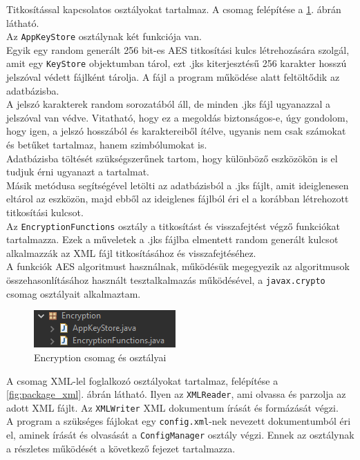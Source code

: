 Titkosítással kapcsolatos osztályokat tartalmaz. A csomag felépítése a \ref{fig:package_encryption}. ábrán látható.
\vspace{5pt}\\Az \texttt{AppKeyStore} osztálynak két funkciója van. 
\\Egyik egy random generált 256 bit-es AES titkosítási kulcs létrehozására szolgál, amit egy \texttt{KeyStore} objektumban tárol, ezt .jks kiterjesztésű 256 karakter hosszú jelszóval védett fájlként tárolja. A fájl a program működése alatt feltöltődik az adatbázisba.
\\A jelszó karakterek random sorozatából áll, de minden .jks fájl ugyanazzal a jelszóval van védve. Vitatható, hogy ez a megoldás biztonságos-e, úgy gondolom, hogy igen, a jelszó hosszából és karaktereiből ítélve, ugyanis nem csak számokat és betűket tartalmaz, hanem szimbólumokat is.
\\Adatbázisba töltését szükségszerűnek tartom, hogy különböző eszközökön is el tudjuk érni ugyanazt a tartalmat.
\\Másik metódusa segítségével letölti az adatbázisból a .jks fájlt, amit ideiglenesen eltárol az eszközön, majd ebből az ideiglenes fájlból éri el a korábban létrehozott titkosítási kulcsot.
\vspace{5pt}\\Az \texttt{EncryptionFunctions} osztály a titkosítást és visszafejtést végző funkciókat tartalmazza. Ezek a műveletek a .jks fájlba elmentett random generált kulcsot alkalmazzák az XML fájl titkosításához és visszafejtéséhez.
\\A funkciók AES algoritmust használnak, működésük megegyezik az algoritmusok összehasonlításához használt tesztalkalmazás működésével, a \texttt{javax.crypto} csomag osztályait alkalmaztam.

\begin{figure}[h]
	\centering
	\includegraphics[scale=0.7]{images/package_encryption.png}
	\caption{Encryption csomag és osztályai}
	\label{fig:package_encryption}
\end{figure}

A csomag XML-lel foglalkozó osztályokat tartalmaz, felépítése a \ref{fig:package_xml}. ábrán látható. Ilyen az \texttt{XMLReader}, ami olvassa és parzolja az adott XML fájlt. Az \texttt{XMLWriter} XML dokumentum írását és formázását végzi.
\vspace{5pt}\\A program a szükséges fájlokat egy \texttt{config.xml}-nek nevezett dokumentumból éri el, aminek írását és olvasását a \texttt{ConfigManager} osztály végzi. Ennek az osztálynak a részletes működését a következő fejezet tartalmazza.


